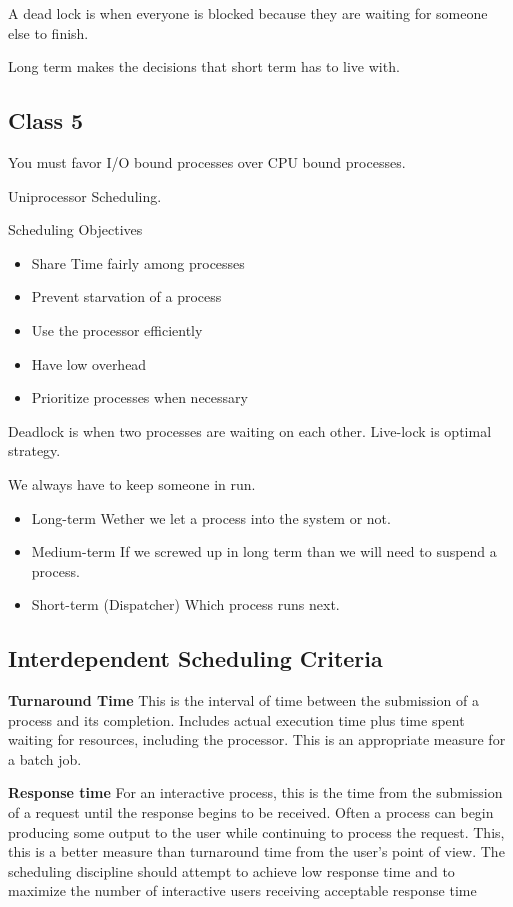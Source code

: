 \documentclass{article}
\begin{document}
A dead lock is when everyone is blocked because they are waiting for someone else to finish. 

Long term makes the decisions that short term has to live with. 

\subsection{Class 5}

You must favor I/O bound processes over CPU bound processes. 

Uniprocessor Scheduling.

Scheduling Objectives
\begin{itemize}
\item Share Time fairly among processes
\item Prevent starvation of a process
\item Use the processor efficiently
\item Have low overhead
\item Prioritize processes when necessary
\end{itemize}

Deadlock is when two processes are waiting on each other.
Live-lock is optimal strategy. 

We always have to keep someone in run.

\begin{itemize}
\item Long-term
Wether we let a process into the system or not.
\item Medium-term
If we screwed up in long term than we will need to suspend a process.
\item Short-term (Dispatcher)
Which process runs next.
\end{itemize}

\subsection{Interdependent Scheduling Criteria}

{\bf Turnaround Time} This is the interval of time between the submission of a process and its completion.
Includes actual execution time plus time spent waiting for resources, including the processor.
This is an appropriate measure for a batch job.

{\bf Response time} For an interactive process, this is the time from the submission of a request until the response begins to be received.
Often a process can begin producing some output to the user while continuing to process the request. 
This, this is a better measure than turnaround time from the user's point of view.
The scheduling discipline should attempt to achieve low response time and to maximize the number of interactive users receiving acceptable response time
\end{document}
